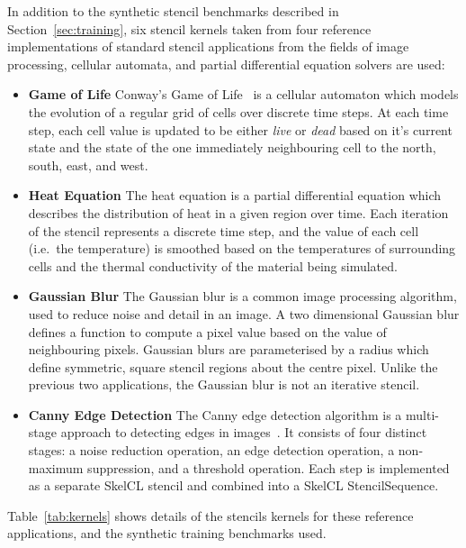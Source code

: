 In addition to the synthetic stencil benchmarks described in
Section~\ref{sec:training}, six stencil kernels taken from four
reference implementations of standard stencil applications from the
fields of image processing, cellular automata, and partial
differential equation solvers are used:
%
\begin{itemize}
\item \textbf{Game of Life} Conway's Game of Life~\cite{Conway1970} is
  a cellular automaton which models the evolution of a regular grid of
  cells over discrete time steps. At each time step, each cell value
  is updated to be either \emph{live} or \emph{dead} based on it's
  current state and the state of the one immediately neighbouring cell
  to the north, south, east, and west.
\item \textbf{Heat Equation} The heat equation is a partial
  differential equation which describes the distribution of heat in a
  given region over time. Each iteration of the stencil represents a
  discrete time step, and the value of each cell (i.e.\ the
  temperature) is smoothed based on the temperatures of surrounding
  cells and the thermal conductivity of the material being simulated.
\item \textbf{Gaussian Blur} The Gaussian blur is a common image
  processing algorithm, used to reduce noise and detail in an image. A
  two dimensional Gaussian blur defines a function to compute a pixel
  value based on the value of neighbouring pixels. Gaussian blurs are
  parameterised by a radius which define symmetric, square stencil
  regions about the centre pixel. Unlike the previous two
  applications, the Gaussian blur is not an iterative stencil.
\item \textbf{Canny Edge Detection} The Canny edge detection algorithm
  is a multi-stage approach to detecting edges in
  images~\cite{Canny1986}. It consists of four distinct stages: a
  noise reduction operation, an edge detection operation, a
  non-maximum suppression, and a threshold operation. Each step is
  implemented as a separate SkelCL stencil and combined into a SkelCL
  StencilSequence.
\end{itemize}
%
Table~\ref{tab:kernels} shows details of the stencils kernels for
these reference applications, and the synthetic training benchmarks
used.

\begin{table}

\caption[Description of stencil kernels]{%
  Stencil kernels, border sizes (north, south, east, and west),
  and static instruction counts.
}
\label{tab:kernels}
\end{table}


